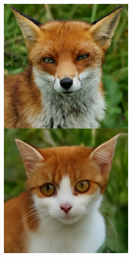 \documentclass{article}
\begin{document}
\begin{figure}
    \begin{minipage}[t]{0.48\textwidth}  %
        \centering
        \begin{minipage}[t]{0.19\textwidth} 
            \includegraphics[width=\linewidth]{img/afhq_main/afhq256_bwd_1.png}

\end{minipage}
\end{minipage}
\end{figure}
\end{document}
